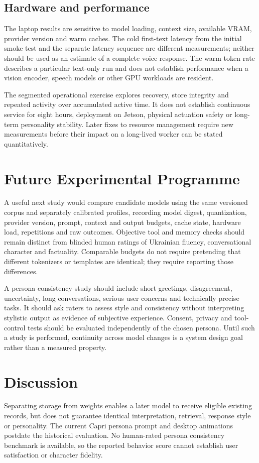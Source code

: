 \documentclass[11pt]{article}
\begin{document}
\subsection{Hardware and performance}
The laptop results are sensitive to model loading, context size, available VRAM, provider version and warm caches. The cold first-text latency from the initial smoke test and the separate latency sequence are different measurements; neither should be used as an estimate of a complete voice response. The warm token rate describes a particular text-only run and does not establish performance when a vision encoder, speech models or other GPU workloads are resident.

The segmented operational exercise explores recovery, store integrity and repeated activity over accumulated active time. It does not establish continuous service for eight hours, deployment on Jetson, physical actuation safety or long-term personality stability. Later fixes to resource management require new measurements before their impact on a long-lived worker can be stated quantitatively.

\section{Future Experimental Programme}
A useful next study would compare candidate models using the same versioned corpus and separately calibrated profiles, recording model digest, quantization, provider version, prompt, context and output budgets, cache state, hardware load, repetitions and raw outcomes. Objective tool and memory checks should remain distinct from blinded human ratings of Ukrainian fluency, conversational character and factuality. Comparable budgets do not require pretending that different tokenizers or templates are identical; they require reporting those differences.

A persona-consistency study should include short greetings, disagreement, uncertainty, long conversations, serious user concerns and technically precise tasks. It should ask raters to assess style and consistency without interpreting stylistic output as evidence of subjective experience. Consent, privacy and tool-control tests should be evaluated independently of the chosen persona. Until such a study is performed, continuity across model changes is a system design goal rather than a measured property.

\section{Discussion}
Separating storage from weights enables a later model to receive eligible existing records, but does not guarantee identical interpretation, retrieval, response style or personality. The current Capri persona prompt and desktop animations postdate the historical evaluation. No human-rated persona consistency benchmark is available, so the reported behavior score cannot establish user satisfaction or character fidelity.
\end{document}
